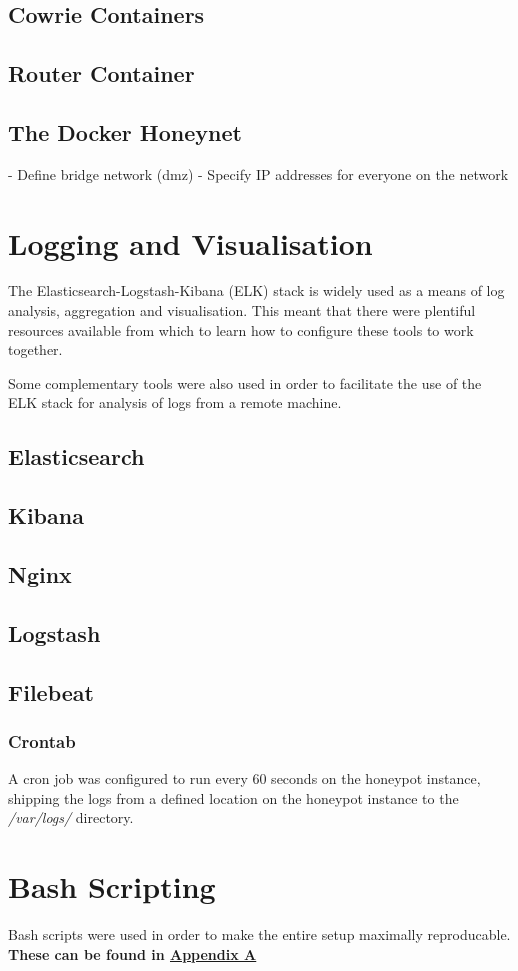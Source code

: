 	\subsection{Cowrie Containers}

	\subsection{Router Container}
	
	\subsection{The Docker Honeynet}
	- Define bridge network (dmz)
	- Specify IP addresses for everyone on the network
	
\section{Logging and Visualisation}

The Elasticsearch-Logstash-Kibana (ELK) stack is widely used as a means of log analysis, aggregation and visualisation. This meant that there were plentiful resources available from which to learn how to configure these tools to work together.

Some complementary tools were also used in order to facilitate the use of the ELK stack for analysis of logs from a remote machine.

	\subsection{Elasticsearch}
	\subsection{Kibana}
	\subsection{Nginx}
	\subsection{Logstash}
	\subsection{Filebeat}
		\subsubsection{Crontab}
		
		A cron job was configured to run every 60 seconds on the honeypot instance, shipping the logs from a defined location on the honeypot instance to the \textit{/var/logs/} directory. 

\section{Bash Scripting}

Bash scripts were used in order to make the entire setup maximally reproducable. \textbf{These can be found in \underline{Appendix A}}
